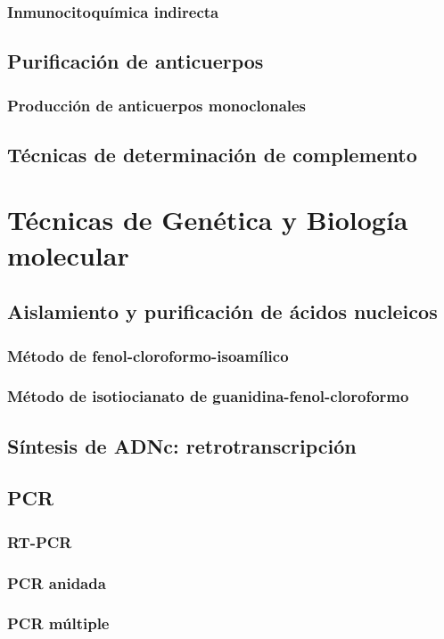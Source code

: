 \subsection{Inmunocitoquímica indirecta}
\section{Purificación de anticuerpos}
\subsection{Producción de anticuerpos monoclonales}
\section{Técnicas de determinación de complemento}
\chapter{Técnicas de Genética y Biología molecular}
\section{Aislamiento y purificación de ácidos nucleicos}
\subsection{Método de fenol-cloroformo-isoamílico}
\subsection{Método de isotiocianato de guanidina-fenol-cloroformo}
\section{Síntesis de ADNc: retrotranscripción}
\section{PCR}
\subsection{RT-PCR}
\subsection{PCR anidada}
\subsection{PCR múltiple}

